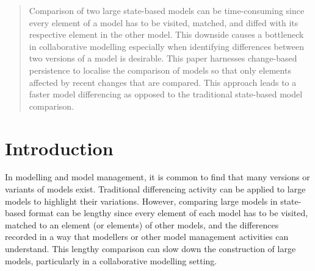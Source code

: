 \documentclass{llncs}
\begin{document}
\begin{abstract}
Comparison of two large state-based models can be time-consuming since every element of a model has to be visited, matched, and diffed with its respective element in the other model. This downside causes a bottleneck in collaborative modelling especially when identifying differences between two versions of a model is desirable. This paper harnesses change-based persistence to localise the comparison of models so that only elements affected by recent changes that are compared. This approach leads to a faster model differencing as opposed to the traditional state-based model comparison. 
\end{abstract}

\vspace{-10pt}
\section{Introduction}
\label{sec:introduction}

\vspace{-5pt}


In modelling and model management, it is common to find that many versions or variants of models exist. 
Traditional differencing activity can be applied to large models to highlight their variations. However,
comparing large models in state-based format can be lengthy since every element of each model has to be visited, matched to an element (or elements) of other models, and the differences recorded in a way that modellers or other model management activities can understand.
This lengthy comparison can slow down the construction of large models, particularly in a collaborative modelling setting. 
\end{document}
